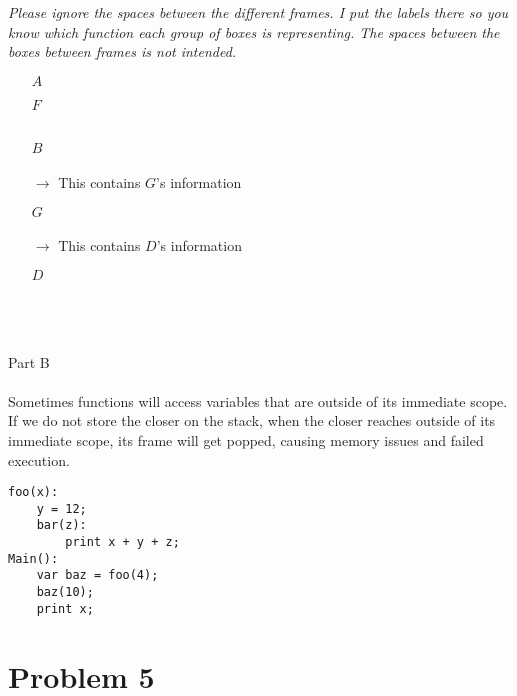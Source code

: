 \documentclass[1pt]{article}
\begin{document}
\textit{ Please ignore the spaces between the different frames.  I put the labels there so you know which function each group of boxes is representing.  The spaces between the boxes between frames is not intended.}
\begin{enumerate}
\item[$A$]

\item[$F$]
\\
\\

\item[$B$]
\\
\\
  $\rightarrow$  This contains $G$'s information\\

\item[$G$]
\\
\\
 $\rightarrow$  This contains $D$'s information \\

\item[$D$]
\\
\\
 \\
\\
\end{enumerate}
{\Large Part B}\\ \\
Sometimes functions will access variables that are outside of its immediate scope.  If we do not store the closer on the stack, when the closer reaches outside of its immediate scope, its frame will get popped, causing memory issues and failed execution.

\begin{verbatim}
foo(x):
    y = 12;
    bar(z):
        print x + y + z;
Main():
    var baz = foo(4);
    baz(10);
    print x;
\end{verbatim} 
\pagebreak

\section{Problem 5}
\end{document}
